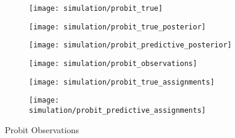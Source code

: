 \documentclass[11pt]{article}
\begin{document}
\begin{figure}
    \centering
    \begin{subfigure}{0.3\textwidth}
        \texttt{[image: simulation/probit\_true]}
    \end{subfigure}
    \begin{subfigure}{0.3\textwidth}
        \texttt{[image: simulation/probit\_true\_posterior]}
    \end{subfigure}
    \begin{subfigure}{0.3\textwidth}
        \texttt{[image: simulation/probit\_predictive\_posterior]}
    \end{subfigure}
    \begin{subfigure}{0.3\textwidth}
        \texttt{[image: simulation/probit\_observations]}
    \end{subfigure}
    \begin{subfigure}{0.3\textwidth}
        \texttt{[image: simulation/probit\_true\_assignments]}
    \end{subfigure}
    \begin{subfigure}{0.3\textwidth}
        \texttt{[image: simulation/probit\_predictive\_assignments]}
    \end{subfigure}
    \caption{Probit Observations}
    \label{fig:probit}
\end{figure}
\end{document}
